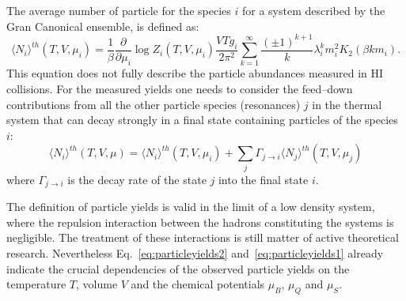 The average number of particle for the species $i$ for a system described by the Gran
Canonical ensemble, is defined as:
\begin{equation} \label{eq:particleyields1}
    \langle N_{i} \rangle ^{th} (T,V,\mu_{i}) = \frac{1}{\beta} \frac{\partial}{\partial \mu_{i}}
    \log Z_{i}(T,V,\mu_{i})
    \frac{V T g_{i}}{2 \pi^{2}}
    \sum_{k=1}^{\infty} \frac{(\pm 1)^{k+1}}{k} \lambda^{k}_{i} m_{i}^{2} K_{2}(\beta k m_{i}).
\end{equation}
This equation does not fully describe the particle abundances measured in HI collisions.
For the measured yields one needs to consider the feed–down contributions from all the other
particle species (resonances) $j$ in the thermal system that can decay strongly in a final
state containing particles of the species $i$:
\begin{equation} \label{eq:particleyields2}
    \langle N_{i} \rangle ^{th} (T,V,\mu) = \langle N_{i} \rangle ^{th} (T,V,\mu_{i})
    + \sum_{j} \Gamma_{j \to i} \langle N_{j} \rangle ^{th} (T,V,\mu_{j})
\end{equation}
where $\Gamma_{j \to i}$ is the decay rate of the state $j$ into the final state $i$.

The definition of particle yields is valid in the limit of a low density system, 
where the repulsion interaction between the hadrons constituting the systems is negligible.
The treatment of these interactions is still matter of active theoretical research. Nevertheless 
Eq.~\ref{eq:particleyields2} and~\ref{eq:particleyields1} already indicate the crucial 
dependencies of the observed particle yields on the
temperature $T$, volume $V$ and the chemical potentials $\mu_B$, $\mu_Q$ and $\mu_S$.

